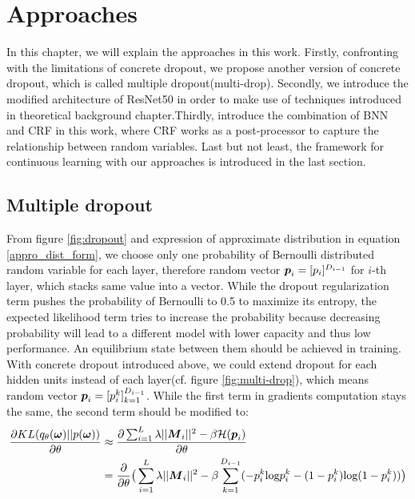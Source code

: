\chapter{Approaches}
In this chapter, we will explain the approaches in this work. Firstly, confronting with the limitations of concrete dropout, we propose another version of concrete dropout, which is called multiple dropout(multi-drop). Secondly, we introduce the modified architecture of ResNet50 in order to make use of techniques introduced in theoretical background chapter.Thirdly, introduce the combination of BNN and CRF in this work, where CRF works as a post-processor to capture the relationship between random variables. Last but not least, the framework for continuous learning with our approaches is introduced in the last section.

\section{Multiple dropout}
From figure \ref{fig:dropout} and expression of approximate distribution in equation \ref{appro_dist_form}, we choose only one probability of Bernoulli distributed random variable for each layer, therefore random vector $\boldsymbol p_i = [p_i]^{D_{i-1}}$ for $i$-th layer, which stacks same value into a vector. While the dropout regularization term pushes the probability of Bernoulli to 0.5 to maximize its entropy, the expected likelihood term tries to increase the probability because decreasing probability will lead to a different model with lower capacity and thus low performance. An equilibrium state between them should be achieved in training. With concrete dropout introduced above, we could extend dropout for each hidden units instead of each layer(cf. figure \ref{fig:multi-drop}), which means random vector $\boldsymbol p_i = [p_i^k]_{k=1}^{D_{i-1}}$. While the first term in gradients computation stays the same, the second term should be modified to:
\begin{equation} 
\begin{aligned}\label{KL_grad_multi}
\frac{\partial KL(q_{\theta}(\boldsymbol \omega)||p(\boldsymbol \omega))}{\partial \theta} 
&\approx \frac{\partial \sum_{i=1}^{L}\lambda||\boldsymbol M_{i}||^{2}- \beta \mathcal H(\boldsymbol p_{i})}{\partial \theta}  \\
&= \frac{\partial}{\partial \theta} \big( \sum_{i=1}^{L}\lambda||\boldsymbol M_{i}||^{2}- \beta \sum_{k=1}^{D_{i-1}}(-p_i^k\text{log}p_i^k - (1-p_i^k)\text{log}(1-p_i^k))\big)
\end{aligned}
\end{equation}  

